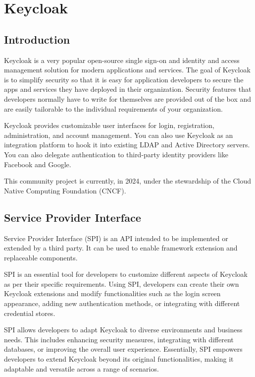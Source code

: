 \chapter{Keycloak}

\section{Introduction}
Keycloak is a very popular open-source single sign-on and identity and access management solution for modern applications and services.
The goal of Keycloak is to simplify security so that it is easy for application developers to secure the apps and services they have deployed in their organization.
Security features that developers normally have to write for themselves are provided out of the box and are easily tailorable to the individual requirements of your organization.

Keycloak provides customizable user interfaces for login, registration, administration, and account management.
You can also use Keycloak as an integration platform to hook it into existing LDAP and Active Directory servers.
You can also delegate authentication to third-party identity providers like Facebook and Google.

This community project is currently, in 2024, under the stewardship of the Cloud Native Computing Foundation (CNCF).\cite{keycloak-web}

\newpage
\section{Service Provider Interface}
Service Provider Interface (SPI) is an API intended to be implemented or extended by a third party.
It can be used to enable framework extension and replaceable components.\cite{keycloak-spi}

SPI is an essential tool for developers to customize different aspects of Keycloak as per their specific requirements.
Using SPI, developers can create their own Keycloak extensions and modify functionalities such as the login screen appearance, adding new authentication methods, or integrating with different credential stores.

SPI allows developers to adapt Keycloak to diverse environments and business needs.
This includes enhancing security measures, integrating with different databases, or improving the overall user experience. Essentially, SPI empowers developers to extend Keycloak beyond its original functionalities, making it adaptable and versatile across a range of scenarios.


